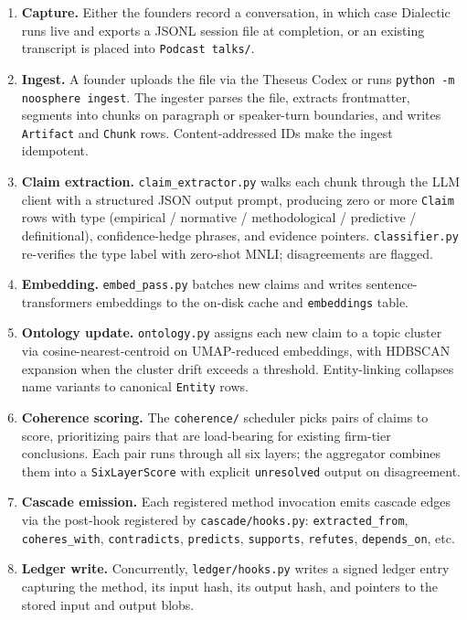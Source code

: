 \documentclass[11pt,letterpaper]{article}
\newcommand{\mod}[1]{\texttt{#1}}
\newcommand{\file}[1]{\texttt{#1}}
\begin{document}
\begin{enumerate}[leftmargin=1.5em,itemsep=0.3em]
  \item \textbf{Capture.} Either the founders record a conversation, in which case Dialectic runs live and exports a JSONL session file at completion, or an existing transcript is placed into \file{Podcast talks/}.
  \item \textbf{Ingest.} A founder uploads the file via the Theseus Codex or runs \texttt{python -m noosphere ingest}. The ingester parses the file, extracts frontmatter, segments into chunks on paragraph or speaker-turn boundaries, and writes \texttt{Artifact} and \texttt{Chunk} rows. Content-addressed IDs make the ingest idempotent.
  \item \textbf{Claim extraction.} \mod{claim\_extractor.py} walks each chunk through the LLM client with a structured JSON output prompt, producing zero or more \texttt{Claim} rows with type (empirical / normative / methodological / predictive / definitional), confidence-hedge phrases, and evidence pointers. \mod{classifier.py} re-verifies the type label with zero-shot MNLI; disagreements are flagged.
  \item \textbf{Embedding.} \mod{embed\_pass.py} batches new claims and writes sentence-transformers embeddings to the on-disk cache and \texttt{embeddings} table.
  \item \textbf{Ontology update.} \mod{ontology.py} assigns each new claim to a topic cluster via cosine-nearest-centroid on UMAP-reduced embeddings, with HDBSCAN expansion when the cluster drift exceeds a threshold. Entity-linking collapses name variants to canonical \texttt{Entity} rows.
  \item \textbf{Coherence scoring.} The \file{coherence/} scheduler picks pairs of claims to score, prioritizing pairs that are load-bearing for existing firm-tier conclusions. Each pair runs through all six layers; the aggregator combines them into a \texttt{SixLayerScore} with explicit \texttt{unresolved} output on disagreement.
  \item \textbf{Cascade emission.} Each registered method invocation emits cascade edges via the post-hook registered by \file{cascade/hooks.py}: \texttt{extracted\_from}, \texttt{coheres\_with}, \texttt{contradicts}, \texttt{predicts}, \texttt{supports}, \texttt{refutes}, \texttt{depends\_on}, etc.
  \item \textbf{Ledger write.} Concurrently, \file{ledger/hooks.py} writes a signed ledger entry capturing the method, its input hash, its output hash, and pointers to the stored input and output blobs.

\end{enumerate}
\end{document}
